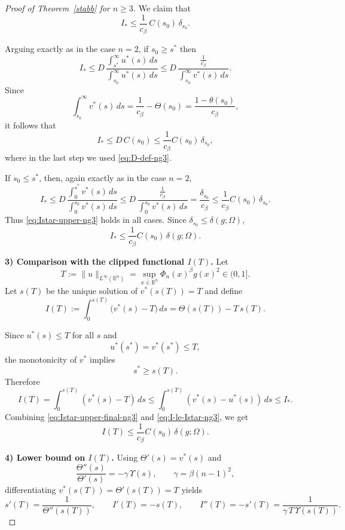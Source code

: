 \documentclass[a4paper,10pt]{amsart}
\begin{document}
\begin{proof}[Proof of Theorem~\ref{stabb} for $n\ge 3$]
We claim that
\begin{equation}\label{eq:Istar-upper-ng3}
I_*\le \frac1{c_\beta}\,C(s_0)\,\delta_{s_0}.
\end{equation}

Arguing exactly as in the case $n=2$, if $s_0\ge s^*$ then
\[
I_*
\le
D\,
\frac{\int_{s^*}^{\infty}u^*(s)\,ds}{\int_{s_0}^{\infty}u^*(s)\,ds}
\le
D\,
\frac{\frac1{c_\beta}}{\int_{s_0}^{\infty}v^*(s)\,ds}.
\]
Since
\[
\int_{s_0}^{\infty}v^*(s)\,ds
=
\frac1{c_\beta}-\Theta(s_0)
=
\frac{1-\theta(s_0)}{c_\beta},
\]
it follows that
\[
I_*
\le
D\,C(s_0)
\le
\frac1{c_\beta}C(s_0)\,\delta_{s_0},
\]
where in the last step we used \eqref{eq:D-def-ng3}.

If $s_0\le s^*$, then, again exactly as in the case $n=2$,
\[
I_*
\le
D\,
\frac{\int_0^{s^*}v^*(s)\,ds}{\int_0^{s_0}v^*(s)\,ds}
\le
D\,
\frac{\frac1{c_\beta}}{\int_0^{s_0}v^*(s)\,ds}
=
\frac{\delta_{s_0}}{c_\beta}
\le
\frac1{c_\beta}C(s_0)\,\delta_{s_0}.
\]
Thus \eqref{eq:Istar-upper-ng3} holds in all cases. Since $\delta_{s_0}\le\delta(g;\Omega)$,
\begin{equation}\label{eq:Istar-upper-final-ng3}
I_*\le \frac1{c_\beta}C(s_0)\,\delta(g;\Omega).
\end{equation}

\smallskip\noindent
\textbf{3) Comparison with the clipped functional $I(T)$.}
Let
\[
T:=\|u\|_{L^\infty(\mathbb B^n)}
=
\sup_{x\in\mathbb B^n}\Phi_n(x)^\beta g(x)^2\in(0,1].
\]
Let $s(T)$ be the unique solution of $v^*(s(T))=T$ and define
\[
I(T):=\int_0^{s(T)}\bigl(v^*(s)-T\bigr)\,ds
=
\Theta(s(T))-T\,s(T).
\]

Since $u^*(s)\le T$ for all $s$ and
\[
u^*(s^*)=v^*(s^*)\le T,
\]
the monotonicity of $v^*$ implies
\[
s^*\ge s(T).
\]
Therefore
\begin{equation}\label{eq:I-le-Istar-ng3}
I(T)
=
\int_0^{s(T)}(v^*(s)-T)\,ds
\le
\int_0^{s(T)}(v^*(s)-u^*(s))\,ds
\le
I_*.
\end{equation}
Combining \eqref{eq:Istar-upper-final-ng3} and \eqref{eq:I-le-Istar-ng3}, we get
\begin{equation}\label{eq:I-upper-deficit-ng3}
I(T)\le \frac1{c_\beta}C(s_0)\,\delta(g;\Omega).
\end{equation}

\smallskip\noindent
\textbf{4) Lower bound on $I(T)$.}
Using $\Theta'(s)=v^*(s)$ and
\[
\frac{\Theta''(s)}{\Theta'(s)}=-\gamma\,\Upsilon(s),
\qquad \gamma=\beta(n-1)^2,
\]
differentiating $v^*(s(T))=\Theta'(s(T))=T$ yields
\[
s'(T)=\frac{1}{\Theta''(s(T))},
\qquad
I'(T)=-s(T),
\qquad
I''(T)=-s'(T)=\frac{1}{\gamma\,T\,\Upsilon(s(T))}.
\]


\end{proof}
\end{document}
